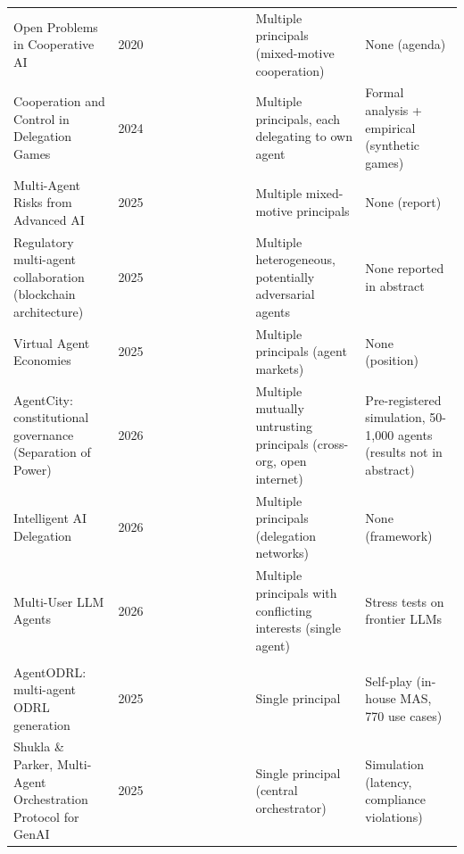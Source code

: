 \documentclass[conference]{IEEEtran}
\newcommand{\full}{{\small\CIRCLE}}
\newcommand{\half}{{\small\LEFTcircle}}
\newcommand{\none}{{\small\Circle}}
\begin{document}
{\begin{longtable}{>{\raggedright\arraybackslash}p{4.2cm} c cccccccc >{\raggedright\arraybackslash}p{3.6cm} >{\raggedright\arraybackslash}p{4.4cm}}
Open Problems in Cooperative AI \cite{dafoe2020open} & 2020 & \half{} & \none{} & \none{} & \none{} & \none{} & \none{} & \none{} & \none{} & Multiple principals (mixed-motive cooperation) & None (agenda) \\
Cooperation and Control in Delegation Games \cite{sourbut2024delegation} & 2024 & \none{} & \none{} & \none{} & \none{} & \none{} & \none{} & \none{} & \none{} & Multiple principals, each delegating to own agent & Formal analysis + empirical (synthetic games) \\
Multi-Agent Risks from Advanced AI \cite{hammond2025multiagent} & 2025 & \half{} & \none{} & \none{} & \none{} & \half{} & \none{} & \none{} & \half{} & Multiple mixed-motive principals & None (report) \\
Regulatory multi-agent collaboration (blockchain architecture) \cite{hu2025regulatory} & 2025 & \none{} & \half{} & \none{} & \none{} & \half{} & \none{} & \half{} & \half{} & Multiple heterogeneous, potentially adversarial agents & None reported in abstract \\
Virtual Agent Economies \cite{tomasev2025virtual} & 2025 & \none{} & \none{} & \half{} & \none{} & \half{} & \none{} & \half{} & \none{} & Multiple principals (agent markets) & None (position) \\
AgentCity: constitutional governance (Separation of Power) \cite{ruan2026agentcity} & 2026 & \none{} & \none{} & \none{} & \none{} & \half{} & \half{} & \half{} & \none{} & Multiple mutually untrusting principals (cross-org, open internet) & Pre-registered simulation, 50-1,000 agents (results not in abstract) \\
Intelligent AI Delegation \cite{tomasev2026intelligent} & 2026 & \none{} & \none{} & \none{} & \half{} & \none{} & \half{} & \half{} & \none{} & Multiple principals (delegation networks) & None (framework) \\
Multi-User LLM Agents \cite{yang2026multiuser} & 2026 & \none{} & \none{} & \none{} & \none{} & \half{} & \none{} & \none{} & \half{} & Multiple principals with conflicting interests (single agent) & Stress tests on frontier LLMs \\
\multicolumn{12}{l}{\textit{Data ecosystems}} \\
AgentODRL: multi-agent ODRL generation \cite{zhong2025agentodrl} & 2025 & \none{} & \none{} & \none{} & \none{} & \none{} & \none{} & \none{} & \none{} & Single principal & Self-play (in-house MAS, 770 use cases) \\
Shukla \& Parker, Multi-Agent Orchestration Protocol for GenAI \cite{shukla2025multiagent} & 2025 & \none{} & \half{} & \none{} & \half{} & \none{} & \none{} & \full{} & \none{} & Single principal (central orchestrator) & Simulation (latency, compliance violations) \\

\end{longtable}}
\end{document}
